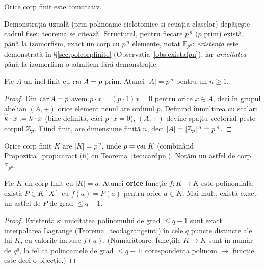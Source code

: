\begin{teorema}[Wedderburn, 1905]\label{teo:wedderburn}
Orice corp finit este comutativ.
\end{teorema}

Demonstrația uzuală (prin polinoame ciclotomice și ecuația claselor) depășește cadrul fișei; teorema se citează. Structural, pentru fiecare $p^{\,n}$ ($p$ prim) există, până la izomorfism, exact un corp cu $p^{\,n}$ elemente, notat $\mathbb F_{p^n}$: \emph{existența} este demonstrată în §\ref{sec:polcorpfinite} (Observația~\ref{obs:existafpn}), iar \emph{unicitatea} până la izomorfism o admitem fără demonstrație.

\begin{teorema}\label{teo:cardpn}
Fie $A$ un inel finit cu $\operatorname{car} A=p$ prim. Atunci $|A|=p^{\,n}$ pentru un $n\ge1$.
\end{teorema}

\begin{proof}
Din $\operatorname{car} A=p$ avem $p\cdot x=(p\cdot1)x=0$ pentru orice $x\in A$, deci în grupul abelian $(A,+)$ orice element nenul are ordinul $p$. Definind înmulțirea cu scalari $\widehat{k}\cdot x:=k\cdot x$ (bine definită, căci $p\cdot x=0$), $(A,+)$ devine spațiu vectorial peste corpul $\mathbb{Z}_p$. Fiind finit, are dimensiune finită $n$, deci $|A|=|\mathbb{Z}_p|^{\,n}=p^{\,n}$.
\end{proof}

\begin{corolar}
Orice corp finit $K$ are $|K|=p^{\,n}$, unde $p=\operatorname{car} K$ (combinând Propoziția~\ref{prop:caract}(ii) cu Teorema~\ref{teo:cardpn}). Notăm un astfel de corp $\mathbb F_{p^n}$.
\end{corolar}

\begin{teorema}\label{teo:functiipol}
Fie $K$ un corp finit cu $|K|=q$. Atunci \textbf{orice} funcție $f:K\to K$ este polinomială: există $P\in K[X]$ cu $f(a)=P(a)$ pentru orice $a\in K$. Mai mult, există exact un astfel de $P$ de grad $\le q-1$.
\end{teorema}

\begin{proof}
Existența și unicitatea polinomului de grad $\le q-1$ sunt exact interpolarea Lagrange (Teorema~\ref{teo:lagrangeint}) în cele $q$ puncte distincte ale lui $K$, cu valorile impuse $f(a)$. (Numărătoare: funcțiile $K\to K$ sunt în număr de $q^{q}$, la fel ca polinoamele de grad $\le q-1$; corespondența polinom $\mapsto$ funcție este deci o bijecție.)
\end{proof}

